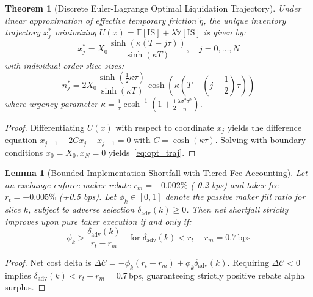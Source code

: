 \documentclass[journal,twocolumn,10pt]{article}
\newtheorem{theorem}{Theorem}
\newtheorem{lemma}{Lemma}
\begin{document}
\begin{theorem}[Discrete Euler-Lagrange Optimal Liquidation Trajectory]
\label{thm:ac_opt}
Under linear approximation of effective temporary friction $\tilde{\eta}$, the unique inventory trajectory $x_j^*$ minimizing $U(x) = \mathbb{E}[\text{IS}] + \lambda \mathbb{V}[\text{IS}]$ is given by:
\begin{equation}
\label{eq:opt_traj}
x_j^* = X_0 \frac{\sinh(\kappa (T - j \tau))}{\sinh(\kappa T)}, \quad j = 0, \dots, N
\end{equation}
with individual order slice sizes:
\begin{equation}
\label{eq:opt_slice}
n_j^* = 2 X_0 \frac{\sinh(\frac{1}{2} \kappa \tau)}{\sinh(\kappa T)} \cosh\left(\kappa \left( T - \left(j - \frac{1}{2}\right) \tau \right)\right)
\end{equation}
where urgency parameter $\kappa = \frac{1}{\tau} \cosh^{-1}\left( 1 + \frac{1}{2} \frac{\lambda \sigma^2 \tau^2}{\tilde{\eta}} \right)$.
\end{theorem}

\begin{proof}
Differentiating $U(x)$ with respect to coordinate $x_j$ yields the difference equation $x_{j+1} - 2 C x_j + x_{j-1} = 0$ with $C = \cosh(\kappa \tau)$. Solving with boundary conditions $x_0 = X_0, x_N = 0$ yields~\eqref{eq:opt_traj}.
\end{proof}

\begin{lemma}[Bounded Implementation Shortfall with Tiered Fee Accounting]
\label{lem:fee}
Let an exchange enforce maker rebate $r_m = -0.002\%$ (-0.2 bps) and taker fee $r_t = +0.005\%$ (+0.5 bps). Let $\phi_k \in [0, 1]$ denote the passive maker fill ratio for slice $k$, subject to adverse selection $\delta_{\text{adv}}(k) \ge 0$. Then net shortfall strictly improves upon pure taker execution if and only if:
\begin{equation}
\phi_k > \frac{\delta_{\text{adv}}(k)}{r_t - r_m} \quad \text{for } \delta_{\text{adv}}(k) < r_t - r_m = 0.7\,\text{bps}
\end{equation}
\end{lemma}

\begin{proof}
Net cost delta is $\Delta \mathcal{C} = -\phi_k (r_t - r_m) + \phi_k \delta_{\text{adv}}(k)$. Requiring $\Delta \mathcal{C} < 0$ implies $\delta_{\text{adv}}(k) < r_t - r_m = 0.7$\,bps, guaranteeing strictly positive rebate alpha surplus.
\end{proof}
\end{document}
